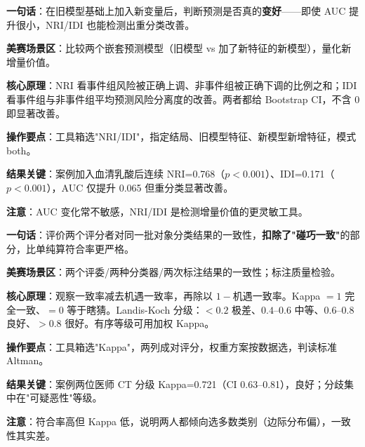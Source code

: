 
\begin{algobrief}
\textbf{一句话}：在旧模型基础上加入新变量后，判断预测是否真的\textbf{变好}——即使 AUC 提升很小，NRI/IDI 也能检测出重分类改善。

\textbf{美赛场景区}：比较两个嵌套预测模型（旧模型 vs 加了新特征的新模型），量化新增量价值。

\textbf{核心原理}：NRI 看事件组风险被正确上调、非事件组被正确下调的比例之和；IDI 看事件组与非事件组平均预测风险分离度的改善。两者都给 Bootstrap CI，不含 0 即显著改善。

\textbf{操作要点}：工具箱选"NRI/IDI"，指定结局、旧模型特征、新模型新增特征，模式 both。

\textbf{结果关键}：案例加入血清乳酸后连续 NRI=0.768（$p<0.001$）、IDI=0.171（$p<0.001$），AUC 仅提升 0.065 但重分类显著改善。

\textbf{注意}：AUC 变化常不敏感，NRI/IDI 是检测增量价值的更灵敏工具。
\end{algobrief}


\begin{algobrief}
\textbf{一句话}：评价两个评分者对同一批对象分类结果的一致性，\textbf{扣除了"碰巧一致"}的部分，比单纯算符合率更严格。

\textbf{美赛场景区}：两个评委/两种分类器/两次标注结果的一致性；标注质量检验。

\textbf{核心原理}：观察一致率减去机遇一致率，再除以 $1-$机遇一致率。Kappa $=1$ 完全一致、$=0$ 等于瞎猜。Landis-Koch 分级：$<0.2$ 极差、$0.4$--$0.6$ 中等、$0.6$--$0.8$ 良好、$>0.8$ 很好。有序等级可用加权 Kappa。

\textbf{操作要点}：工具箱选"Kappa"，两列成对评分，权重方案按数据选，判读标准 Altman。

\textbf{结果关键}：案例两位医师 CT 分级 Kappa=0.721（CI 0.63--0.81），良好；分歧集中在"可疑恶性"等级。

\textbf{注意}：符合率高但 Kappa 低，说明两人都倾向选多数类别（边际分布偏），一致性其实差。
\end{algobrief}


